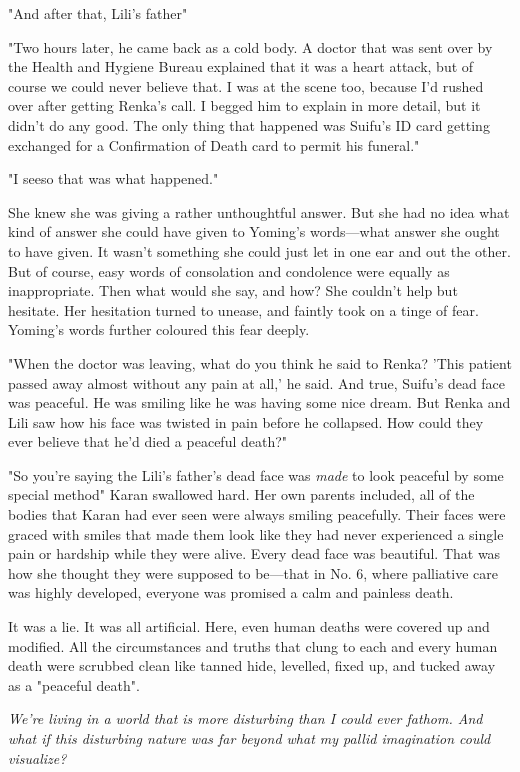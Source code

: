 "And after that, Lili's father\el "

"Two hours later, he came back as a cold body. A doctor that was sent
over by the Health and Hygiene Bureau explained that it was a heart
attack, but of course we could never believe that. I was at the scene
too, because I'd rushed over after getting Renka's call. I begged him to
explain in more detail, but it didn't do any good. The only thing that
happened was Suifu's ID card getting exchanged for a Confirmation of
Death card to permit his funeral."

"I see\el so that was what happened."

She knew she was giving a rather unthoughtful answer. But she had no
idea what kind of answer she could have given to Yoming's words---what
answer she ought to have given. It wasn't something she could just let
in one ear and out the other. But of course, easy words of consolation
and condolence were equally as inappropriate. Then what would she say,
and how? She couldn't help but hesitate. Her hesitation turned to
unease, and faintly took on a tinge of fear. Yoming's words further
coloured this fear deeply.

"When the doctor was leaving, what do you think he said to Renka? 'This
patient passed away almost without any pain at all,' he said. And true,
Suifu's dead face was peaceful. He was smiling like he was having some
nice dream. But Renka and Lili saw how his face was twisted in pain
before he collapsed. How could they ever believe that he'd died a
peaceful death?"

"So you're saying the Lili's father's dead face was \emph{made} to look
peaceful by some special method\el " Karan swallowed hard. Her own
parents included, all of the bodies that Karan had ever seen were always
smiling peacefully. Their faces were graced with smiles that made them
look like they had never experienced a single pain or hardship while
they were alive. Every dead face was beautiful. That was how she thought
they were supposed to be---that in No. 6, where palliative care was highly
developed, everyone was promised a calm and painless death.

It was a lie. It was all artificial. Here, even human deaths were
covered up and modified. All the circumstances and truths that clung to
each and every human death were scrubbed clean like tanned hide,
levelled, fixed up, and tucked away as a "peaceful death".

\emph{We're living in a world that is more disturbing than I could ever
fathom. And what if this disturbing nature was far beyond what my pallid
imagination could visualize\el ?}

